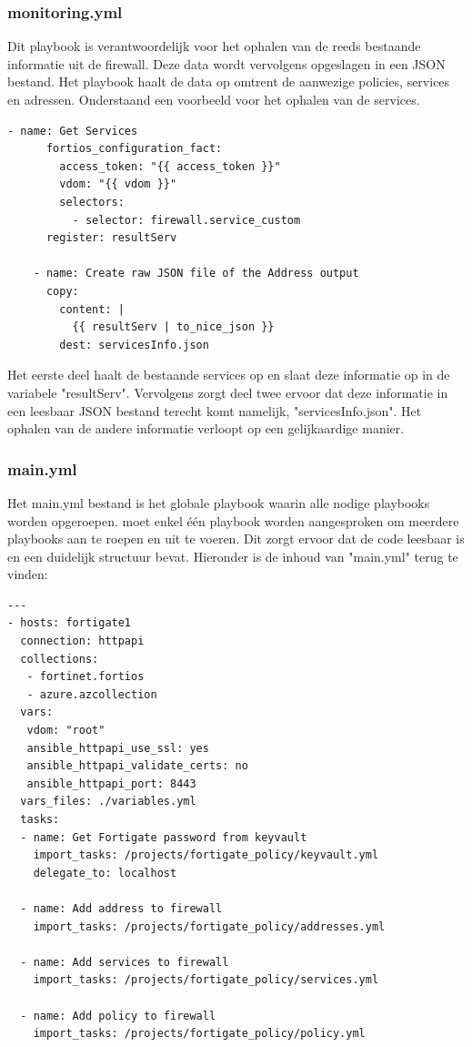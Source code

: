 \subsubsection{monitoring.yml}
\label{subsubsec:monitoring.yml}
Dit playbook is verantwoordelijk voor het ophalen van de reeds bestaande informatie uit de firewall. Deze data wordt vervolgens opgeslagen in een JSON bestand. Het playbook haalt de data op omtrent de aanwezige policies, services en adressen. Onderstaand een voorbeeld voor het ophalen van de services. 
\begin{lstlisting}[caption={Playbook monitoring.yml}]
    - name: Get Services
      fortios_configuration_fact:
        access_token: "{{ access_token }}"
        vdom: "{{ vdom }}"
        selectors: 
          - selector: firewall.service_custom
      register: resultServ

    - name: Create raw JSON file of the Address output
      copy:
        content: |
          {{ resultServ | to_nice_json }} 
        dest: servicesInfo.json
\end{lstlisting}
Het eerste deel haalt de bestaande services op en slaat deze informatie op in de variabele "resultServ". Vervolgens zorgt deel twee ervoor dat deze informatie in een leesbaar JSON bestand terecht komt namelijk, "servicesInfo.json". Het ophalen van de andere informatie verloopt op een gelijkaardige manier. 
\subsubsection{main.yml}
\label{subsub:main.yml}
Het main.yml bestand is het globale playbook waarin alle nodige playbooks worden opgeroepen. moet enkel één playbook worden aangesproken om meerdere playbooks aan te roepen en uit te voeren. Dit zorgt ervoor dat de code leesbaar is en een duidelijk structuur bevat. Hieronder is de inhoud van "main.yml" terug te vinden:
\begin{lstlisting}[caption={Playbook main.yml}]
    ---
- hosts: fortigate1
  connection: httpapi                                       
  collections:
   - fortinet.fortios
   - azure.azcollection
  vars:
   vdom: "root"
   ansible_httpapi_use_ssl: yes
   ansible_httpapi_validate_certs: no
   ansible_httpapi_port: 8443
  vars_files: ./variables.yml
  tasks:
  - name: Get Fortigate password from keyvault
    import_tasks: /projects/fortigate_policy/keyvault.yml
    delegate_to: localhost
   
  - name: Add address to firewall 
    import_tasks: /projects/fortigate_policy/addresses.yml

  - name: Add services to firewall 
    import_tasks: /projects/fortigate_policy/services.yml
  
  - name: Add policy to firewall
    import_tasks: /projects/fortigate_policy/policy.yml
\end{lstlisting}

